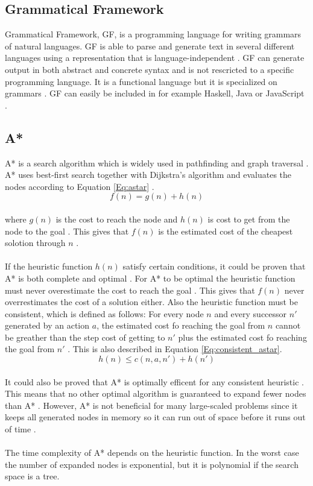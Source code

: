 \subsection{Grammatical Framework}
Grammatical Framework, GF, is a programming language for writing grammars of natural languages. GF is able to parse and generate text in several different languages using a representation that is language-independent \citep{gf_url}. GF can generate output in both abstract and concrete syntax and is not rescricted to a specific programming language. It is a functional language but it is specialized on grammars \citep{gf_url}. 
GF can easily be included in for example Haskell, Java or JavaScript \citep{gf_url}.

\subsection{A*}
A* is a search algorithm which is widely used in pathfinding and graph traversal \citep{astar_url}. A* uses best-first search together with Dijkstra's algorithm and evaluates the nodes according to Equation \ref{Eq:astar} \citep{astar_url}. \\
\begin{equation}
f(n) = g(n) + h(n)
\label{Eq:astar}
\end{equation}\\
where $g(n)$ is the cost to reach the node and $h(n)$ is cost to get from the node to the goal \citep{astar_url}. This gives that $f(n)$ is the estimated cost of the cheapest solotion through $n$ \citep{astar_url}. 
\\\\
If the heuristic function $h(n)$ satisfy certain conditions, it could be proven that A* is both complete and optimal \citep{astar_ai}. For A* to be optimal the heuristic function must never overestimate the cost to reach the goal \citep{astar_ai}. This gives that $f(n)$ never overrestimates the cost of a solution either. Also the heuristic function must be consistent, which is defined as follows: For every node $n$ and every successor $n'$ generated by an action $a$, the estimated cost fo reaching the goal from $n$ cannot be greather than the step cost of getting to $n'$ plus the estimated cost fo reaching the goal from $n'$ \citep{astar_ai}. This is also described in Equation \ref{Eq:consistent_astar}.\\
\begin{equation}
h(n) \leq c(n, a, n') + h(n')
\label{Eq:consistent_astar}
\end{equation}\\
It could also be proved that A* is optimally efficent for any consistent heuristic \citep{astar_ai}. This means that no other optimal algorithm is guaranteed to expand fewer nodes than A* \citep{astar_ai}. However, A* is not beneficial for many large-scaled problems since it keeps all generated nodes in memory so it can run out of space before it runs out of time \citep{astar_ai}.\\\\
The time complexity of A* depends on the heuristic function. In the worst case the number of expanded nodes is exponential, but it is polynomial if the search space is a tree.

